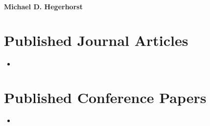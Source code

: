 %
%
%
%

\begin{vita}

\begin{center}
{\Large \bf Michael D. Hegerhorst}\\
\end{center}

\section*{Published Journal Articles}
    \begin{itemize}
    \item 
    \end{itemize}

\section*{Published Conference Papers}
    \begin{itemize}
    \item
    \end{itemize}

\end{vita}
